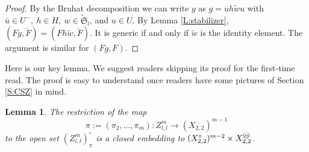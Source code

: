 \documentclass{amsart}
\newtheorem{lemma}[theorem]{Lemma}
\theoremstyle{definition}
\theoremstyle{remark}
\numberwithin{equation}{section}
\newcommand{\mf}[1]{\mathfrak{#1}}
\newcommand{\br}[1]{\overline{#1}}
\newcommand{\wtd}[1]{\widetilde{#1}}
\newcommand{\zllm}{{Z_{l,l}^m}}
\newcommand{\circm}{{\mathop{\text{\textcircled{\tiny \textit m}}}\nolimits}}
\begin{document}
\begin{proof} By the Bruhat decomposition we can write $g$ as $g=\br{u}h\wtd{w}u$ with $\br{u}\in U^-,\ h\in H,\ w\in \wtd{\mf{S}}_l$, and $u\in U$.
By Lemma \ref{L:stabilizer}, $(Fg,\check{F})=(Fh\wtd{w},\check{F})$.
It is generic if and only if $\wtd{w}$ is the identity element. The argument is similar for $(Fg,F)$.
\end{proof} 

Here is our key lemma. We suggest readers skipping its proof for the first-time read. 
The proof is easy to understand once readers have some pictures of Section \ref{S:CSZ} in mind. 
\begin{lemma} \label{L:embedding}  The restriction of the map 
	$$\pi:=(\pi_2,\dots,\pi_{m}): \zllm\to (X_{2,2})^{m-1}$$ 
	to the open set $(\zllm)^\circ_\pi$ is a closed embedding to $(X_{2,2}^\circ)^{m-2} \times X_{2,2}^{\circm}$.
\end{lemma}
\end{document}
